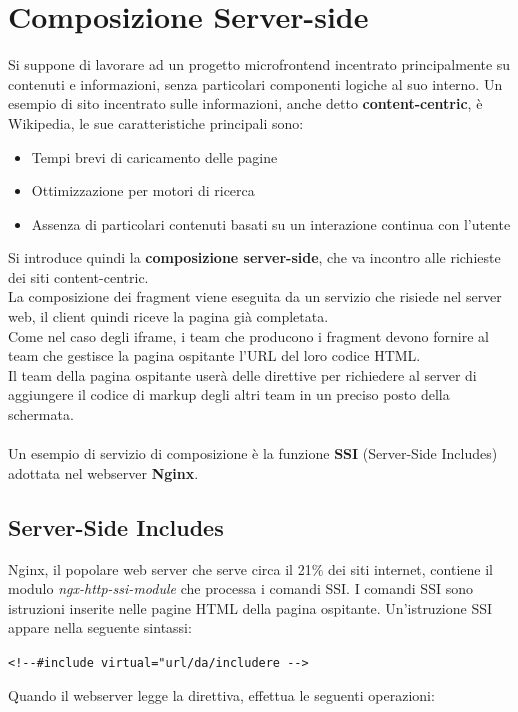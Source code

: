\section{Composizione Server-side}
Si suppone di lavorare ad un progetto microfrontend incentrato principalmente su contenuti e informazioni, senza particolari componenti logiche al suo interno.
Un esempio di sito incentrato sulle informazioni, anche detto \textbf{content-centric}, è Wikipedia, le sue caratteristiche principali sono:
\begin{itemize}
    \item Tempi brevi di caricamento delle pagine
    \item Ottimizzazione per motori di ricerca
    \item Assenza di particolari contenuti basati su un interazione continua con l'utente
\end{itemize}
Si introduce quindi la \textbf{composizione server-side}, che va incontro alle richieste dei siti content-centric.
\\La composizione dei fragment viene eseguita da un servizio che risiede nel server web, il client quindi riceve la pagina già completata.
\\Come nel caso degli iframe, i team che producono i fragment devono 
fornire al team che gestisce la pagina ospitante l'URL del loro codice HTML.
\\Il team della pagina ospitante userà delle direttive 
per richiedere al server di aggiungere il codice di markup degli altri team in un preciso posto della schermata.
\\\\Un esempio di servizio di composizione è la funzione \textbf{SSI} (Server-Side Includes) adottata nel webserver \textbf{Nginx}.

\subsection{Server-Side Includes}
Nginx, il popolare web server che serve circa il 21\% dei siti internet\cite{nginx}, contiene il modulo \emph{ngx-http-ssi-module} che processa i comandi SSI.
 I comandi SSI sono istruzioni
inserite nelle pagine HTML della pagina ospitante. Un'istruzione SSI appare nella seguente sintassi:

   \begin{center}
    \verb|<!--#include virtual="url/da/includere -->|
   \end{center}
Quando il webserver legge la direttiva, effettua le seguenti operazioni:

